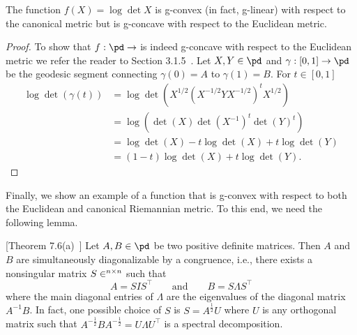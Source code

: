 \documentclass[twoside,11pt]{article}
\begin{document}
\begin{prop}\label{prop:prove_logdet_gcvx}
    The function  $f(X) = \log \det X$ is g-convex (in fact, g-linear) with respect to the canonical metric but is g-concave with respect to the Euclidean metric.
\end{prop}
\begin{proof}
    To show that $f:\pd \to \real$ is indeed g-concave with respect to  
    the Euclidean metric we refer the reader to Section 3.1.5~\citep{Boyd_Vandenberghe_2004}. Let $X, Y \in \pd$ and $\gamma:[0,1] \to \pd$ be the geodesic segment connecting $\gamma(0) = A$ to $\gamma(1) = B$. For $t \in [0,1]$
    \[
    \begin{aligned}
         \log \det \left(\gamma(t) \right) &= \log \det \left(X^{1/2}(X^{-1/2}YX^{-1/2})^t X^{1/2} \right) 
            \\&= \log \left( \det(X) \det(X^{-1})^t \det(Y)^t \right) 
            \\&= \log \det(X) - t \log \det(X) + t \log \det(Y) 
            \\&= (1-t) \log \det (X) + t \log \det (Y).
    \end{aligned}
    \]
\end{proof}
Finally, we show an example of a function that is g-convex with respect to both the Euclidean and canonical Riemannian metric. To this end, we need the following lemma.

\begin{lemma}\label{lemma:diagonalize_pd}[Theorem 7.6(a)~\citep{horn_matrixanalysis}]
        Let $A, B \in \pd$ be two positive definite matrices. Then $A$ and $B$ are simultaneously diagonalizable by a congruence, i.e., there exists a nonsingular matrix $S \in \real^{n \times n}$ such that 
        \[
        A = S I S^\top \qquad \text{and} \qquad B = S \Lambda S^\top
        \]
        where the main diagonal entries of $\Lambda$ are the eigenvalues of the diagonal matrix $A^{-1} B$. In fact, one possible choice of $S$ is $S = A^{\frac{1}{2}} U$ where $U$ is any orthogonal matrix such that $A^{-\frac{1}{2}}B A^{-\frac{1}{2}} = U \Lambda U^\top$ is a spectral decomposition.
    \end{lemma}
\end{document}
